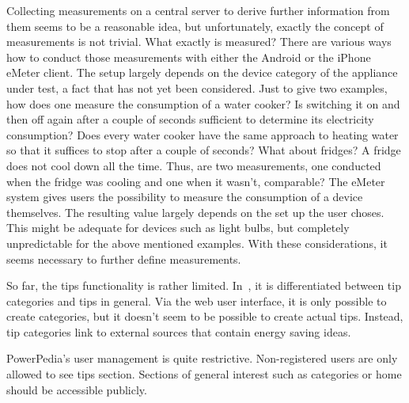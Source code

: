Collecting measurements on a central server to derive further information from them seems to be a reasonable idea, but unfortunately, exactly the concept of measurements is not trivial. What exactly is measured?    
There are various ways how to conduct those measurements with either the Android or the iPhone eMeter client. The setup largely depends on the device category of the appliance under test, a fact that has not yet been considered. Just to give two examples, how does one measure the consumption of a water cooker? Is switching it on and then off again after a couple of seconds sufficient to determine its electricity consumption? Does every water cooker have the same approach to heating water so that it suffices to stop after a couple of seconds? What about fridges? A fridge does not cool down all the time. Thus, are two measurements, one conducted when the fridge was cooling and one when it wasn't, comparable? 
The eMeter system gives users the possibility to measure the consumption of a device themselves. 
The resulting value largely depends on the set up the user choses. This might be adequate for devices such as light bulbs, but completely unpredictable for the above mentioned examples. 
With these considerations, it seems necessary to further define measurements. 

So far, the tips functionality is rather limited. In~\cite{merklepp}, it is differentiated between tip categories and tips in general. Via the web user interface, it is only possible to create categories, but it doesn't seem to be possible to create actual tips. Instead, tip categories link to external sources that contain energy saving ideas. 
 
PowerPedia's user management is quite restrictive. Non-registered users are only allowed to see tips section. Sections of general interest such as categories or home should be accessible publicly. 

